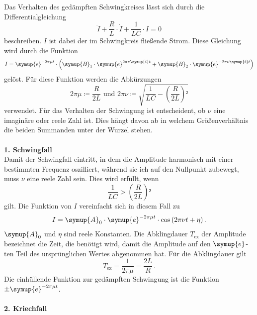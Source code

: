 Das Verhalten des gedämpften Schwingkreises lässt sich durch die Differentialgleichung 
\begin{equation}
    \ddot{I} + \frac{R}{L} \cdot \dot{I} + \frac{1}{L C} \cdot I = 0 
\end{equation}
beschreiben. $I$ ist dabei der im Schwingkreis fließende Strom. 
Diese Gleichung wird durch die Funktion  
\begin{equation}
    I = \symup{e}^{-2\pi\mu t} \cdot \left(\symup{B}_1 \cdot \symup{e}^{2\pi\nu \symup{i}t}  + \symup{B}_2 \cdot \symup{e}^{- 2\pi\nu \symup{i}t} \right)
\end{equation}
gelöst. Für diese Funktion werden die Abkürzungen 
\begin{equation*}
2 \pi \mu \coloneqq \frac{R}{2 L}  \,\,\text{und}\,\, 2 \pi \nu \coloneqq \sqrt{\frac{1}{LC} - \left(\frac{R}{2L}\right)²}
\end{equation*}
verwendet. Für das Verhalten der Schwingung ist entscheident, ob $\nu$ eine imaginäre
oder reele Zahl ist. Dies hängt davon ab in welchem Größenverhältnis die beiden 
Summanden unter der Wurzel stehen. \\
\\
\textbf{1. Schwingfall}\\
Damit der Schwingfall eintritt, in dem die Amplitude harmonisch mit einer bestimmten Frequenz 
oszilliert, während sie ich auf den 
Nullpunkt zubewegt, muss $\nu$ eine reele Zahl sein. Dies wird erfüllt, wenn 
\begin{equation*}
    \frac{1}{LC} > \left(\frac{R}{2L}\right)² 
\end{equation*}
gilt. Die Funktion von $I$ vereinfacht sich in diesem Fall zu
\begin{equation}
    I = \symup{A}_0 \cdot \symup{e}^{-2\pi\mu t} \cdot \cos{ \left(2\pi\nu t + \eta\right)} \, .
\end{equation}
$\symup{A}_0$ und $\eta$ sind reele Konstanten. Die Abklingdauer $T_{\text{ex}}$ der Amplitude bezeichnet
die Zeit, die benötigt wird, damit die Amplitude auf den $\symup{e}$-ten Teil des 
ursprünglichen Wertes abgenommen hat. Für die Abklingdauer gilt
\begin{equation}
    T_{\text{ex}} = \frac{1}{2\pi\mu} = \frac{2 L}{R} \, .
\end{equation}
Die einhüllende Funktion zur gedämpften Schwingung ist die Funktion $\pm \symup{e}^{-2\pi\mu t}$. \\
\\
\textbf{2. Kriechfall}\\
